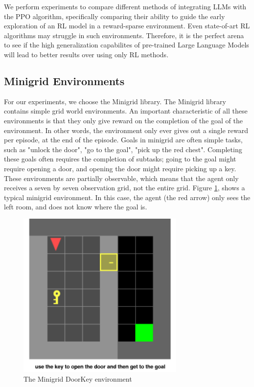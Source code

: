 \documentclass[conference]{IEEEtran}
\begin{document}
We perform experiments to compare different methods of integrating LLMs with the PPO algorithm, specifically comparing their ability to guide the early exploration of an RL model in a reward-sparse environment. Even state-of-art RL algorithms may struggle in such environments. Therefore, it is the perfect arena to see if the high generalization capabilites of pre-trained Large Language Models will lead to better results over using only RL methods.

\subsection{Minigrid Environments}

For our experiments, we choose the Minigrid library. The Minigrid library contains simple grid world environments. An important characteristic of all these environments is that they only give reward on the completion of the goal of the environment. In other words, the environment only ever gives out a single reward per episode, at the end of the episode. Goals in minigrid are often simple tasks, such as "unlock the door", "go to the goal", "pick up the red chest". Completing these goals often requires the completion of subtasks; going to the goal might require opening a door, and opening the door might require picking up a key. These environments are partially observable, which means that the agent only receives a seven by seven observation grid, not the entire grid. Figure \ref{doorkeyenv}, shows a typical minigrid environment. In this case, the agent (the red arrow) only sees the left room, and does not know where the goal is.

\begin{figure}[h]
\centerline{\includegraphics[width=3.25in]{figure/doorkeyenv.png}}
\caption{The Minigrid DoorKey environment}
\label{doorkeyenv}
\end{figure}
\end{document}
